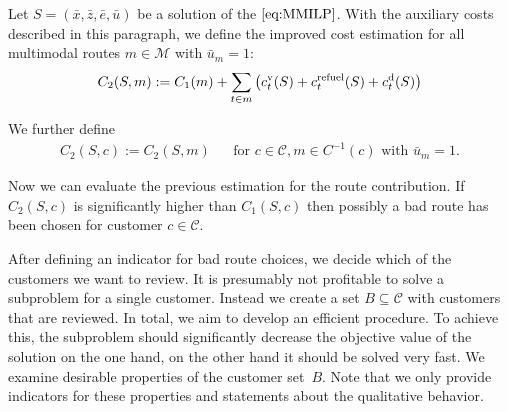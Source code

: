 \begin{definition}

Let $S=\left(\bar{x},\bar{z},\bar{e},\bar{u}\right)$ be a solution of the $\eqref{eq:MMILP}$. With the auxiliary costs described in this paragraph, we define the improved cost estimation for all multimodal routes ${m\in\mathcal{M}}$ with ${\bar{u}_m=1}$:
\begin{align*}
	C_2(S,m) := C_1(m) + \sum_{t\in m}\left(c^{\operatorname{v}}_t(S) + c^{\operatorname{refuel}}_t(S) + c^{\operatorname{d}}_t(S)\right)
\end{align*}

We further define 
\begin{align*}
	C_2(S,c) := C_2(S,m) && \text{for } c\in\mathcal{C},m\in C^{-1}(c) \text{ with } \bar{u}_m = 1.
\end{align*}

\end{definition}

Now we can evaluate the previous estimation for the route contribution. If $C_2(S,c)$ is significantly higher than $C_1(S,c)$ then possibly a bad route has been chosen for customer $c\in\mathcal{C}$.

After defining an indicator for bad route choices, we decide which of the customers we want to review. It is presumably not profitable to solve a subproblem for a single customer. Instead we create a set ${B\subseteq\mathcal{C}}$ with customers that are reviewed. In total, we aim to develop an efficient procedure. To achieve this, the subproblem should significantly decrease the objective value of the solution on the one hand, on the other hand it should be solved very fast. We examine desirable properties of the customer set~$B$. Note that we only provide indicators for these properties and statements about the qualitative behavior.

